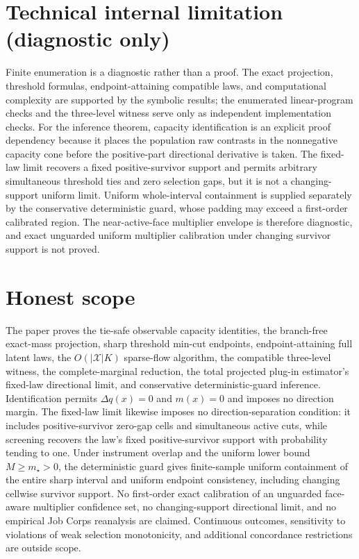 \documentclass{article}
\begin{document}
\section*{Technical internal limitation (diagnostic only)}

Finite enumeration is a diagnostic rather than a proof. The exact projection, threshold formulas, endpoint-attaining compatible laws, and computational complexity are supported by the symbolic results; the enumerated linear-program checks and the three-level witness serve only as independent implementation checks. For the inference theorem, capacity identification is an explicit proof dependency because it places the population raw contrasts in the nonnegative capacity cone before the positive-part directional derivative is taken. The fixed-law limit recovers a fixed positive-survivor support and permits arbitrary simultaneous threshold ties and zero selection gaps, but it is not a changing-support uniform limit. Uniform whole-interval containment is supplied separately by the conservative deterministic guard, whose padding may exceed a first-order calibrated region. The near-active-face multiplier envelope is therefore diagnostic, and exact unguarded uniform multiplier calibration under changing survivor support is not proved.

\section{Honest scope}

The paper proves the tie-safe observable capacity identities, the branch-free exact-mass projection, sharp threshold min-cut endpoints, endpoint-attaining full latent laws, the \(O(|\mathcal X|K)\) sparse-flow algorithm, the compatible three-level witness, the complete-marginal reduction, the total projected plug-in estimator's fixed-law directional limit, and conservative deterministic-guard inference. Identification permits \(\Delta q(x)=0\) and \(m(x)=0\) and imposes no direction margin. The fixed-law limit likewise imposes no direction-separation condition: it includes positive-survivor zero-gap cells and simultaneous active cuts, while screening recovers the law's fixed positive-survivor support with probability tending to one. Under instrument overlap and the uniform lower bound \(M\ge m_{\star}>0\), the deterministic guard gives finite-sample uniform containment of the entire sharp interval and uniform endpoint consistency, including changing cellwise survivor support. No first-order exact calibration of an unguarded face-aware multiplier confidence set, no changing-support directional limit, and no empirical Job Corps reanalysis are claimed. Continuous outcomes, sensitivity to violations of weak selection monotonicity, and additional concordance restrictions are outside scope.
\end{document}
